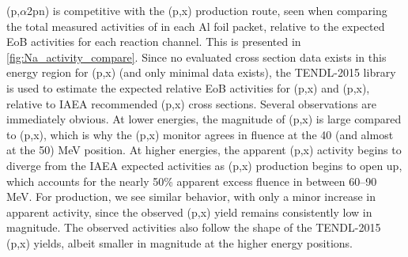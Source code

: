\documentclass[3p]{elsarticle}
\begin{document}
(p,$\alpha$2pn) 
is competitive with the (p,x) 
production route,
seen when comparing the total measured activities of   
in each Al foil packet, 
relative to the expected EoB activities for each reaction channel.
This is presented in \autoref{fig:Na_activity_compare}.
Since no evaluated  cross section data exists in this energy region  for  (p,x)  (and only minimal  data exists),  the TENDL-2015 library is used to estimate the expected relative EoB activities for (p,x) and (p,x), 
relative to IAEA recommended (p,x) cross sections.
Several observations are immediately obvious.
At lower energies, the magnitude of (p,x) is large compared to (p,x), which is why the (p,x) monitor agrees in fluence at the 40 (and almost at the 50) MeV position.  
At higher energies, the apparent (p,x) activity begins to diverge from the IAEA expected activities as     (p,x) production begins to open up,  which accounts for the nearly 50\% apparent excess fluence in  between 60--90 MeV.
For   production, we see  similar behavior, with only a minor increase in apparent  activity,  since the observed (p,x) yield remains consistently low in magnitude.
The observed  activities also follow the shape of the TENDL-2015 (p,x) yields, albeit smaller in magnitude at the higher energy positions.
\end{document}
